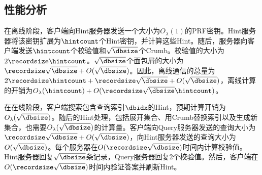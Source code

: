 \subsection{性能分析}
在离线阶段，客户端向Hint服务器发送一个大小为$O_\lambda(1)$的PRF密钥。Hint服务器将该密钥扩展为$\hintcount$个Hint密钥，并计算这些Hint。随后，服务器向客户端发送$\hintcount$个校验值和$\sqrt{\dbsize}$个Crumb。校验值的大小为$2\recordsize\hintcount$。$\sqrt{\dbsize}$个面包屑的大小为$\recordsize\sqrt{\dbsize} + O(\sqrt{\dbsize})$。因此，离线通信的总量为$2\recordsize\hintcount + \recordsize\sqrt{\dbsize} + O(\sqrt{\dbsize})$，离线计算的开销为$O_\lambda(\hintcount) + O(\recordsize\sqrt{\dbsize}\hintcount)$。

在在线阶段，客户端搜索包含查询索引$\dbidx$的Hint，预期计算开销为$O_\lambda(\sqrt{\dbsize})$。随后的Hint处理，包括展开集合、用Crumb替换索引以及生成新集合，也需要$O_\lambda(\sqrt{\dbsize})$的计算量。客户端向Query服务器发送的查询大小为$\recordsize\sqrt{\dbsize} + O(\sqrt{\dbsize})$，向Hint服务器发送的查询大小为$O(\sqrt{\dbsize})$。每个服务器在$O(\recordsize\sqrt{\dbsize})$时间内计算校验值。Hint服务器回复$\sqrt{\dbsize}$条记录，Query服务器回复2个校验值。然后，客户端在$O(\recordsize\sqrt{\dbsize})$时间内验证答案并刷新Hint。
